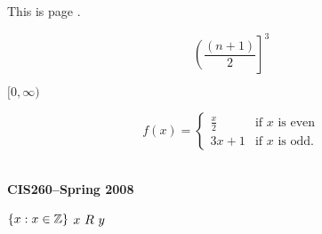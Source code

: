 \documentclass[12pt]{article} %
\newcommand{\set}[1]{\ensuremath\{#1\}}
\newcommand{\R}[2]{\ensuremath #1\ R\ #2}
\begin{document}
This is page \thepage.

\[
\left(\frac{(n+1)}{2}\right]^3
\]

$[0,\infty)$

\[
f(x)=\left\{
\begin{array}{ll}
\frac{x}{2} & \mbox{if $x$ is even}\\
3x+1 & \mbox{if $x$ is odd}.
\end{array}
\right. %
\]

\noindent{}\\
\textbf{CIS260--Spring 2008}

$\set{x:x\in\mathbb Z}$ $\R{x}{y}$
\end{document}

